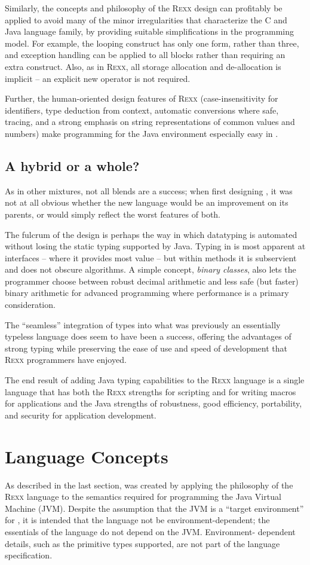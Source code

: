 Similarly, the concepts and philosophy of the R\textsc{exx} design can profitably be applied to avoid many of the minor irregularities that characterize the C and Java language family, by providing suitable simplifications in the programming model. For example, the \nr{} looping construct has only one form, rather than three, and exception handling can be applied to all blocks rather than requiring an extra construct. Also, as in R\textsc{exx}, all \nr{} storage allocation and de-allocation is implicit – an explicit new operator is not required.

Further, the human-oriented design features of R\textsc{exx}
(case-insensitivity for identifiers, type deduction from context,
automatic conversions where safe, tracing, and a strong emphasis on
string representations of common values and numbers) make programming
for the Java environment especially easy in \nr{}.
\subsection{A hybrid or a whole?}
As in other mixtures, not all blends are a success; when first designing \nr{}, it was not at all obvious whether the new language would be an improvement on its parents, or would simply reflect the worst features of both.

The fulcrum of the design is perhaps the way in which datatyping is automated without losing the static typing supported by Java. Typing in \nr{} is most apparent at interfaces – where it provides most value – but within methods it is subservient and does not obscure algorithms. A simple concept, \emph{binary classes}, also lets the programmer choose between robust decimal arithmetic and less safe (but faster) binary arithmetic for advanced programming where performance is a primary consideration.

The “seamless” integration of types into what was previously an essentially typeless language does seem to have been a success, offering the advantages of strong typing while preserving the ease of use and speed of development that R\textsc{exx} programmers have enjoyed.

The end result of adding Java typing capabilities to the R\textsc{exx} language
is a single language that has both the R\textsc{exx} strengths for scripting
and for writing macros for applications and the Java strengths of
robustness, good efficiency, portability, and security for application
development.
\section{Language Concepts}
As described in the last section, \nr{} was created by applying the philosophy of the R\textsc{exx} language to the semantics required for programming the Java Virtual Machine (JVM). Despite the assumption that the JVM is a “target environment” for \nr{}, it is intended that the language not be environment-dependent; the essentials of the language do not depend on the JVM. Environment- dependent details, such as the primitive types supported, are not part of the language specification.

